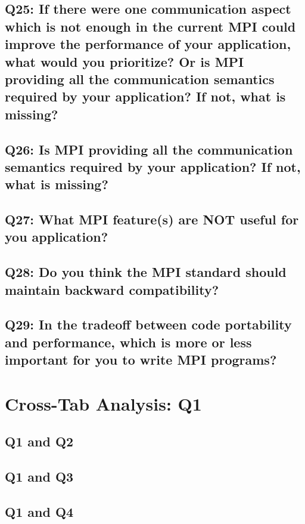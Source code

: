 \documentclass{report}
\begin{document}
\clearpage
\section{Q25: If there were one communication aspect which is not enough in the current MPI could improve the performance of your application, what would you prioritize? Or is MPI providing all the communication semantics required by your application? If not, what is missing?}


\clearpage
\section{Q26: Is MPI providing all the communication semantics required by your application? If not, what is missing?}


\clearpage
\section{Q27: What MPI feature(s) are NOT useful for you application?}


\clearpage
\section{Q28: Do you think the MPI standard should maintain backward compatibility?}


\clearpage
\section{Q29: In the tradeoff between code portability and performance, which is more or less important for you to write MPI programs?}


\chapter{Cross-Tab Analysis: Q1}

\section{Q1 and Q2}\clearpage
\section{Q1 and Q3}\clearpage
\section{Q1 and Q4}\clearpage
\end{document}
